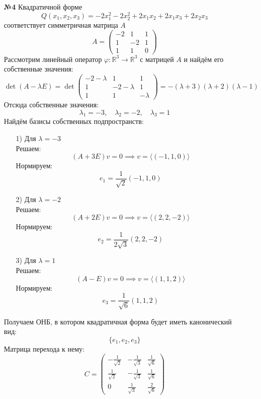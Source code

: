 \documentclass[a4paper]{article}
\renewcommand{\f}[2]{\frac{#1}{#2}}
\renewcommand{\phi}{\varphi}
\newcommand{\RR}{\mathbb{R}}
\begin{document}
\begin{enumerate}
    \item[\textbf{№4}]Квадратичной форме
    $$
    Q(x_1,x_2,x_3)=-2x_1^2-2x_2^2+2x_1x_2+2x_1x_3+2x_2x_3
    $$
    соответствует симметричная матрица $A$
    $$
    A=\begin{pmatrix}
    -2 & 1 & 1\\
    1  & -2& 1\\
    1  & 1 & 0
    \end{pmatrix}
    $$
    Рассмотрим линейный оператор $\phi: \RR^3 \to \RR^3$ с матрицей $A$ и найдём его собственные значения:
    $$
    \det(A-\lambda E)
    =\det\begin{pmatrix}
    -2-\lambda & 1         & 1\\
    1          & -2-\lambda& 1\\
    1          & 1         & -\lambda
    \end{pmatrix}=-(\lambda+3)(\lambda+2)(\lambda-1)
    $$ 
    Отсюда собственные значения:
    $$
    \lambda_1=-3,\quad \lambda_2=-2,\quad \lambda_3=1
    $$
    Найдём базисы собственных подпространств:
    \begin{enumerate}
        \item[1)]Для $\lambda = -3$\\
        Решаем:
        $$(A+3E)v=0 \implies 
        v=\langle (-1, 1, 0) \rangle
        $$
        Нормируем:
        $$e_1 = \f{1}{\sqrt{2}}(-1, 1, 0)$$
        \item[2)]Для $\lambda = -2$\\
        Решаем:
        $$(A+2E)v=0 \implies 
        v=\langle (2, 2, -2) \rangle
        $$
        Нормируем:
        $$e_2 = \f{1}{2\sqrt{3}}(2, 2, -2)$$
        \item[3)]Для $\lambda = 1$\\
        Решаем:
        $$(A-E)v=0 \implies 
        v=\langle(1, 1, 2) \rangle
        $$
        Нормируем:
        $$e_3 = \f{1}{\sqrt{6}}(1, 1, 2)$$
    \end{enumerate}
    Получаем ОНБ, в котором квадратичная форма будет иметь канонический вид:
    $$\{e_1, e_2, e_3\}$$
    Матрица перехода к нему:
    $$C = \begin{pmatrix}
    -\tfrac1{\sqrt2} & -\tfrac1{\sqrt3} & \tfrac1{\sqrt6}\\[6pt]
    \tfrac1{\sqrt2} & -\tfrac1{\sqrt3} & \tfrac1{\sqrt6}\\[6pt]
    0                &  \tfrac1{\sqrt3} & \tfrac{2}{\sqrt6}
    \end{pmatrix}$$


\end{enumerate}
\end{document}
